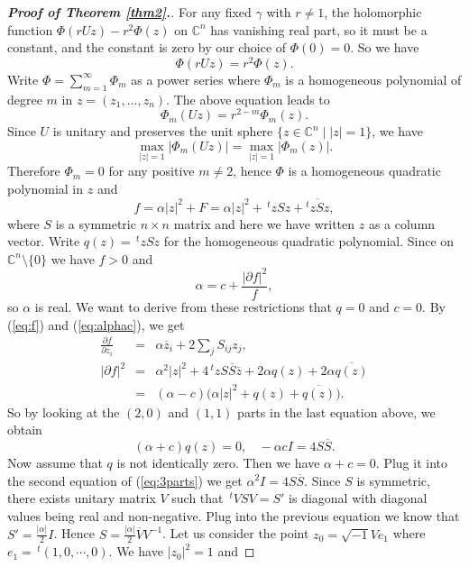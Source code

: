 \documentclass{amsart}
\numberwithin{equation}{section}
\begin{document}
\begin{proof}[{\bf Proof of Theorem \ref{thm2}.}]
For any fixed $\gamma$ with $r\neq 1$,  the holomorphic function $\Phi(rUz)-r^2\Phi (z)$ on ${\mathbb C}^n$ has vanishing real part, so it must be a constant, and the constant is zero by our choice of $\Phi (0)=0$. So we have
$$ \Phi (rUz) = r^2 \Phi (z). $$
Write $\Phi = \sum_{m=1}^{\infty } \Phi_m$ as a power series where $\Phi_m$ is a homogeneous polynomial of degree $m$ in $z=(z_1, \ldots , z_n)$.  The above equation leads to
$$ \Phi_m (Uz) = r^{2-m}\Phi_m (z). $$
Since $U$ is unitary and preserves the unit sphere $\{ z\in {\mathbb C}^n \mid |z|=1\}$, we have
$$  \max_{|z|=1} |\Phi_m(Uz)| = \max_{|z|=1} |\Phi_m (z)|. $$
Therefore $\Phi_m=0$ for any positive $m\neq 2$, hence $\Phi$ is a homogeneous quadratic polynomial in $z$ and
\begin{equation}  \label{eq:f}
f = \alpha |z|^2 + F = \alpha |z|^2 + \,^t\!zSz + \overline{^t\!zSz},
\end{equation}
where $S$ is a symmetric $n\times n$ matrix and here we have written $z$ as a column vector. Write $q(z)=\,^t\!zSz$ for the homogeneous quadratic polynomial. Since  on ${\mathbb C}^n\setminus \{0\}$ we have $f>0$ and
\begin{equation} \label{eq:alphac}
 \alpha = c+ \frac{|\partial f|^2 }{f},
\end{equation}
so $\alpha$ is real. We want to derive from these restrictions that $q=0$ and $c=0$. By (\ref{eq:f}) and (\ref{eq:alphac}), we get
\begin{eqnarray*}
 \frac{\partial f}{\partial z_i} &= & \alpha \overline{z}_i + 2\sum_j S_{ij}z_j, \\
 |\partial f|^2 & =&  \alpha^2|z|^2  + 4\,^t\!zS\overline{S}\overline{z} + 2\alpha q(z) + 2 \alpha \overline{q(z)} \\
&=&  (\alpha -c)\big( \alpha |z|^2 + q(z) + \overline{q(z)} \big).
 \end{eqnarray*}
So by looking at the $(2,0)$ and $(1,1)$ parts in the last equation above, we obtain
\begin{equation} \label{eq:3parts}
(\alpha +c)q(z)=0, \ \  \ \ -\alpha c I = 4 S \overline{S}.
\end{equation}
Now assume that $q$ is not identically zero. Then we have $\alpha +c=0$. Plug it into the second equation of (\ref{eq:3parts}) we get $\alpha^2I=4S\overline{S}$. Since $S$ is symmetric, there exists unitary matrix $V$ such that $\,^t\!VSV=S'$ is diagonal with diagonal values being real and non-negative. Plug into the previous equation we know that $S'=\frac{|\alpha|}{2}I$. Hence $S=\frac{|\alpha|}{2} \overline{V} V^{-1}$. Let us consider the point $z_0=\sqrt{-1}Ve_1$ where $e_1=\,^t\!(1, 0, \cdots , 0)$. We have $|z_0|^2=1$ and

\end{proof}
\end{document}
